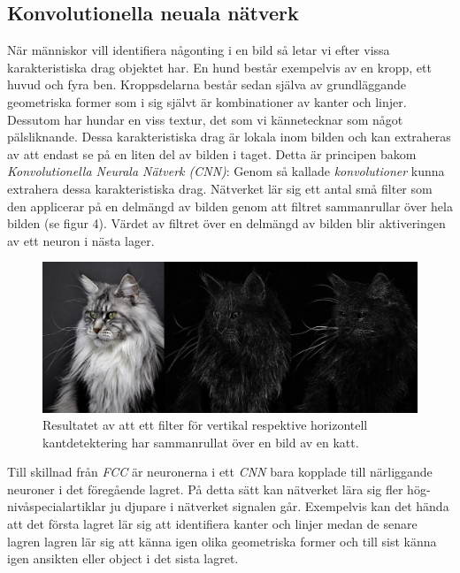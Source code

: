 \documentclass[a4paper,11pt,twoside]{article}
\begin{document}
\subsection{Konvolutionella neuala nätverk}
När människor vill identifiera någonting i en bild så letar vi efter vissa karakteristiska drag objektet har. En hund består exempelvis av en kropp, ett huvud och fyra ben. Kroppsdelarna består sedan själva av grundläggande geometriska former som i sig självt är kombinationer av kanter och linjer. Dessutom har hundar en viss textur, det som vi kännetecknar som något pälsliknande. Dessa karakteristiska drag är lokala inom bilden och kan extraheras av att endast se på en liten del av bilden i taget. Detta är principen bakom \textit{Konvolutionella Neurala Nätverk (CNN)}: Genom så kallade \textit{konvolutioner} kunna extrahera dessa karakteristiska drag. Nätverket lär sig ett antal små filter som den applicerar på en delmängd av bilden genom att filtret sammanrullar över hela bilden (se figur 4). Värdet av filtret över en delmängd av bilden blir aktiveringen av ett neuron i nästa lager. \cite{cs231n}

\begin{figure}[h]\label{figkatter}
	\centering
  		\includegraphics[scale=0.33]{katter.png}
  	\caption{Resultatet av att ett filter för vertikal respektive horizontell kantdetektering har sammanrullat över en bild av en katt.}
\end{figure}

Till skillnad från \textit{FCC} är neuronerna i ett \textit{CNN} bara kopplade till närliggande neuroner i det föregående lagret. På detta sätt kan nätverket lära sig fler hög-nivåspecialartiklar ju djupare i nätverket signalen går. Exempelvis kan det hända att det första lagret lär sig att identifiera kanter och linjer medan de senare lagren lagren lär sig att känna igen olika geometriska former och till sist känna igen ansikten eller object i det sista lagret. \cite{cs231n}
\end{document}
